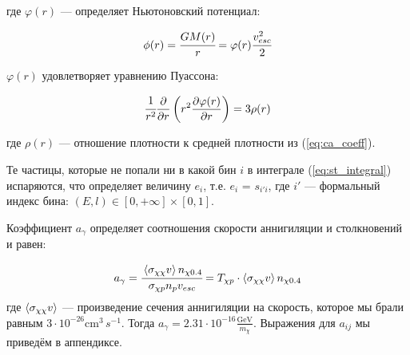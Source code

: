 где $\varphi(r)$ --- определяет Ньютоновский потенциал:

\begin{equation*}
	\phi(r) = \cfrac{GM(r)}{r} = \varphi(r) \cfrac{v_{esc}^2}{2} 
\end{equation*}

$\varphi(r)$ удовлетворяет уравнению Пуассона:

\begin{equation}
	\cfrac{1}{r^2}\frac{\partial }{\partial r}
	\left(r^2\frac{\partial \varphi(r)}{\partial r}\right) = 3\rho(r)
\end{equation}

где $\rho(r)$ --- отношение плотности к средней плотности из (\ref{eq:ca_coeff}).


Те частицы, которые не попали ни в какой бин $i$ в интеграле (\ref{eq:st_integral}) испаряются, что определяет величину $e_i$, т.е. $e_i$ = $s_{i'i}$, где $i'$ --- формальный индекс бина: $(E,l) \in [0,+\infty]\times[0,1]$.

Коэффициент $a_{\gamma}$ определяет соотношения скорости аннигиляции и столкновений и равен:

\begin{equation}
	a_{\gamma} = \cfrac{ \left\langle \sigma_{\chi\chi} v \right\rangle n_{\chi 0.4}}{\sigma_{\chi p} n_{p} v_{esc}} = 
	T_{\chi p} \cdot \left\langle \sigma_{\chi\chi} v \right\rangle n_{\chi 0.4}
\end{equation}
где $\left\langle \sigma_{\chi\chi} v \right\rangle$ --- произведение сечения аннигиляции на скорость, которое мы брали равным $3\cdot10^{-26}\text{cm}^3\,{s^{-1}}$. Тогда $a_{\gamma} = 2.31\cdot10^{-16} \frac{\text{GeV}}{m_{\chi}}$. Выражения для $a_{ij}$ мы приведём в аппендиксе.

